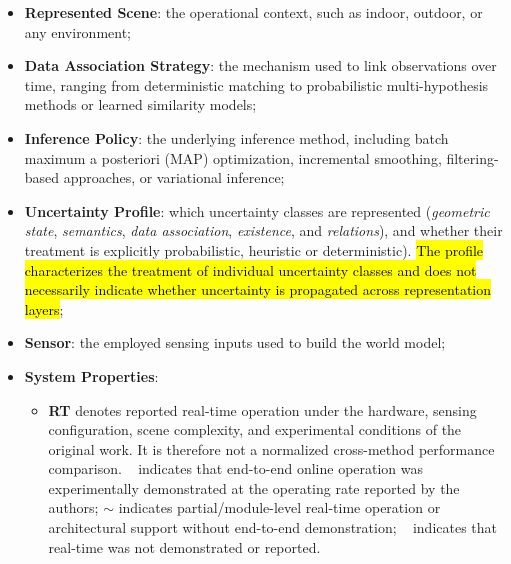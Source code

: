\begin{itemize}
    \hl{For each category, $\checkmark$ indicates that the corresponding mechanism is experimentally demonstrated in the original work; $\sim$ indicates explicit architectural or component-level support without a corresponding system-level experimental demonstration; and $\times$ indicates that no explicit support is reported. These indicators characterize the reported evidence of dynamics coverage, independently of the probabilistic treatment of architectural coupling of the corresponding mechanisms};
    \item \textbf{Represented Scene}: the operational context, such as indoor, outdoor, or any environment;
    \item \textbf{Data Association Strategy}: the mechanism used to link observations over time, ranging from deterministic matching to probabilistic multi-hypothesis methods or learned similarity models;
    \item \textbf{Inference Policy}: the underlying inference method, including batch maximum a posteriori (MAP) optimization, incremental smoothing, filtering-based approaches, or variational inference;
    \item \textbf{Uncertainty Profile}:  which uncertainty classes are represented (\textit{geometric state}, \textit{semantics}, \textit{data association}, \textit{existence}, and \textit{relations}), and whether their treatment is explicitly probabilistic, heuristic or deterministic). \hl{The profile characterizes the treatment of individual uncertainty classes and does not necessarily indicate whether uncertainty is propagated across representation layers};
    \item \textbf{Sensor}: the employed sensing inputs used to build the world model;
    \item \textbf{System Properties}: 
    \begin{itemize}
        \item \textbf{RT} denotes reported real-time operation under the hardware, sensing configuration, scene complexity, and experimental conditions of the original work. It is therefore not a normalized cross-method performance comparison. \checkmark~ indicates that end-to-end online operation was experimentally demonstrated at the operating rate reported by the authors; $\sim$ indicates partial/module-level real-time operation or architectural support without end-to-end demonstration; \xmark~ indicates that real-time was not demonstrated or reported.

\end{itemize}
\end{itemize}
